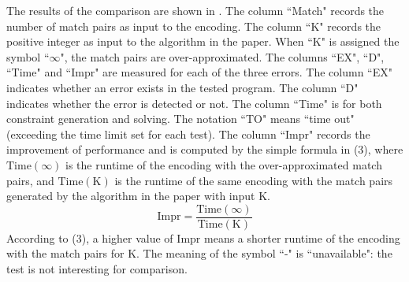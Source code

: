 The results of the comparison are shown in .  
The column ``Match" records the number of match pairs as input to the encoding. The column ``K" records the positive integer as input to the algorithm in the paper. When ``K" is assigned the symbol ``$\infty$", the match pairs are over-approximated. The columns ``EX", ``D", ``Time" and ``Impr" are measured for each of the three errors. The column ``EX" indicates whether an error exists in the tested program. The column ``D" indicates whether the error is detected or not. The column ``Time" is for both constraint generation and solving. The notation ``TO" means ``time out" (exceeding the time limit set for each test). The column ``Impr" records the improvement of performance and is computed by the simple formula in (3), where $\mathrm{Time}(\infty)$ is the runtime of the encoding with the over-approximated match pairs, and $\mathrm{Time}(\mathrm{K})$ is the runtime of the same encoding with the match pairs generated by the algorithm in the paper with input K. 
\begin{equation}
\mathrm{Impr} = \frac{\mathrm{Time}(\infty)}{\mathrm{Time}(\mathrm{K})}
\end{equation}
According to (3), a higher value of $\mathrm{Impr}$ means a shorter runtime of the encoding with the match pairs for K.
The meaning of the symbol ``-" is ``unavailable": the test is not interesting for comparison.

